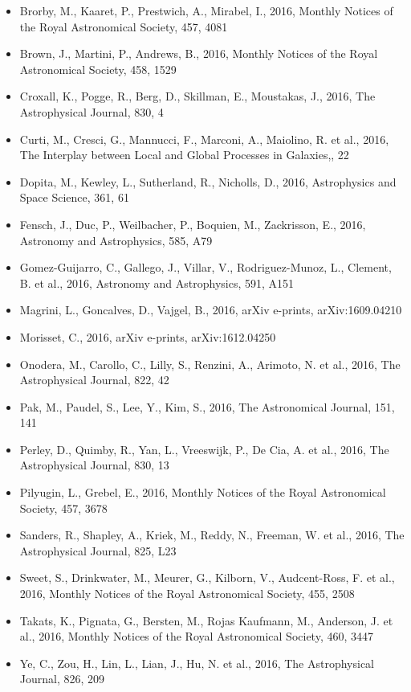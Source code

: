\documentclass{letter}
\begin{document}
\begin{enumerate}
\begin{itemize}
\item Brorby, M., Kaaret, P., Prestwich, A., Mirabel, I., 2016, Monthly Notices of the Royal Astronomical Society, 457, 4081
\item Brown, J., Martini, P., Andrews, B., 2016, Monthly Notices of the Royal Astronomical Society, 458, 1529
\item Croxall, K., Pogge, R., Berg, D., Skillman, E., Moustakas, J., 2016, The Astrophysical Journal, 830, 4
\item Curti, M., Cresci, G., Mannucci, F., Marconi, A., Maiolino, R. et al., 2016, The Interplay between Local and Global Processes in Galaxies,, 22
\item Dopita, M., Kewley, L., Sutherland, R., Nicholls, D., 2016, Astrophysics and Space Science, 361, 61
\item Fensch, J., Duc, P., Weilbacher, P., Boquien, M., Zackrisson, E., 2016, Astronomy and Astrophysics, 585, A79
\item Gomez-Guijarro, C., Gallego, J., Villar, V., Rodriguez-Munoz, L., Clement, B. et al., 2016, Astronomy and Astrophysics, 591, A151
\item Magrini, L., Goncalves, D., Vajgel, B., 2016, arXiv e-prints, arXiv:1609.04210
\item Morisset, C., 2016, arXiv e-prints, arXiv:1612.04250
\item Onodera, M., Carollo, C., Lilly, S., Renzini, A., Arimoto, N. et al., 2016, The Astrophysical Journal, 822, 42
\item Pak, M., Paudel, S., Lee, Y., Kim, S., 2016, The Astronomical Journal, 151, 141
\item Perley, D., Quimby, R., Yan, L., Vreeswijk, P., De Cia, A. et al., 2016, The Astrophysical Journal, 830, 13
\item Pilyugin, L., Grebel, E., 2016, Monthly Notices of the Royal Astronomical Society, 457, 3678
\item Sanders, R., Shapley, A., Kriek, M., Reddy, N., Freeman, W. et al., 2016, The Astrophysical Journal, 825, L23
\item Sweet, S., Drinkwater, M., Meurer, G., Kilborn, V., Audcent-Ross, F. et al., 2016, Monthly Notices of the Royal Astronomical Society, 455, 2508
\item Takats, K., Pignata, G., Bersten, M., Rojas Kaufmann, M., Anderson, J. et al., 2016, Monthly Notices of the Royal Astronomical Society, 460, 3447
\item Ye, C., Zou, H., Lin, L., Lian, J., Hu, N. et al., 2016, The Astrophysical Journal, 826, 209

\end{itemize}
\end{enumerate}
\end{document}
